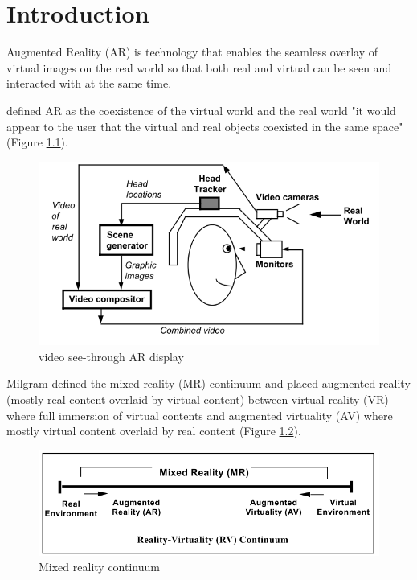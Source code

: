 \chapter{Introduction} %
\label{ch:intro} %

Augmented Reality (AR) is technology that enables the seamless overlay of virtual images on the real world so that both real and virtual can be seen and interacted with at the same time. 

\cite{azuma1997survey} defined AR as the coexistence of the virtual world and the real world "it would appear to the user that the virtual and real objects coexisted in the same space" (Figure \ref{fig:video-see-through}).

\begin{figure}
    \centering
    \includegraphics[width=.8\linewidth]{images/video-see-through-ar.png}
    \caption{video see-through AR display}
    \label{fig:video-see-through}
\end{figure}

Milgram \cite{Milgram1995a} defined the mixed reality (MR) continuum and placed augmented reality (mostly real content overlaid by virtual content) between virtual reality (VR) where full immersion of virtual contents and augmented virtuality (AV) where mostly virtual content overlaid by real content (Figure \ref{fig:mr-continuum}). 

\begin{figure}
    \centering
    \includegraphics[width=.8\linewidth]{images/mixed-reality-continuum.png}
    \caption{Mixed reality continuum}
    \label{fig:mr-continuum}
\end{figure}

